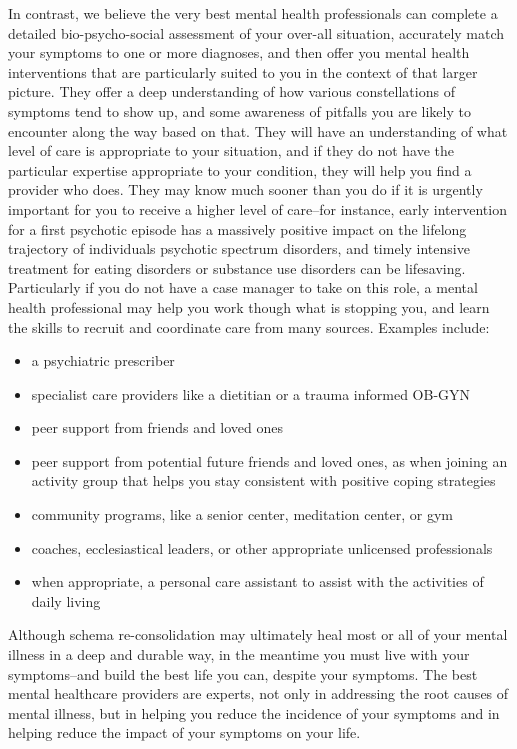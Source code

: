 \documentclass[12pt,letterpaper]{book}
\begin{document}
In contrast, we believe the very best mental health professionals can complete a detailed bio-psycho-social assessment of your over-all situation, accurately match your symptoms to one or more diagnoses, and then offer you mental health interventions that are particularly suited to you in the context of that larger picture. They offer a deep understanding of how various constellations of symptoms tend to show up, and some awareness of pitfalls you are likely to encounter along the way based on that. They will have an understanding of what level of care is appropriate to your situation, and if they do not have the particular expertise appropriate to your condition, they will help you find a provider who does. They may know much sooner than you do if it is urgently important for you to receive a higher level of care--for instance, early intervention for a first psychotic episode has a massively positive impact on the lifelong trajectory of individuals psychotic spectrum disorders, and timely intensive treatment for eating disorders or substance use disorders can be lifesaving. Particularly if you do not have a case manager to take on this role, a mental health professional may help you work though what is stopping you, and learn the skills to recruit and coordinate care from many sources. Examples include:
\begin{itemize}
    \item a psychiatric prescriber 
    \item specialist care providers like a dietitian or a trauma informed OB-GYN
    \item peer support from friends and loved ones
    \item peer support from potential future friends and loved ones, as when joining an activity group that helps you stay consistent with positive coping strategies
    \item community programs, like a senior center, meditation center, or gym
    \item coaches, ecclesiastical leaders, or other appropriate unlicensed professionals
    \item when appropriate, a personal care assistant to assist with the activities of daily living
\end{itemize}
Although schema re-consolidation may ultimately heal most or all of your mental illness in a deep and durable way, in the meantime you must live with your symptoms--and build the best life you can, despite your symptoms. The best mental healthcare providers are experts, not only in addressing the root causes of mental illness, but in helping you reduce the incidence of your symptoms and in helping reduce the impact of your symptoms on your life. 
\end{document}
